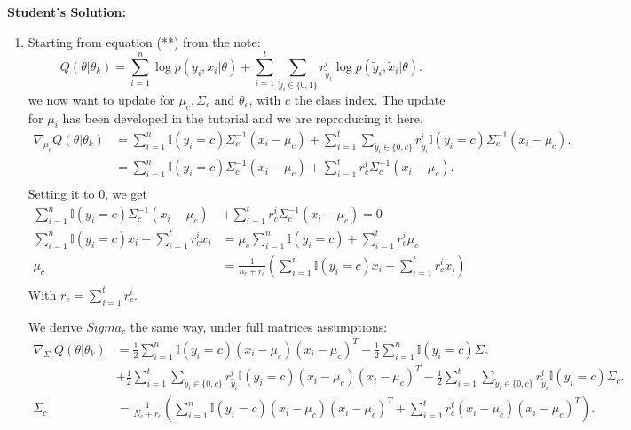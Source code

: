 \documentclass{article}
\begin{document}
\textbf{Student's Solution:}
\begin{enumerate}
  \item Starting from equation (**) from the note:
  \[
  Q(\theta|\theta_k) =  \sum_{i=1}^n \log p(y_i ,x_i |\theta)+ \sum_{i=1}^t\sum_{\tilde{y}_i\in\{0,1\}} r_{\tilde{y}_i}^i\log p(\tilde{y}_i ,\tilde{x}_i |\theta).
  \]
  we now want to update for $\mu_c,\Sigma_c$ and $\theta_c$, with $c$ the class index.
  The update for $\mu_i$ has been developed in the tutorial and we are reproducing it here.
  \begin{align}
  \nabla_{\mu_c} Q(\theta|\theta_k) &=  \sum_{i=1}^n \mathbb{I}(y_i = c)\Sigma_c^{-1}(x_i - \mu_c) + \sum_{i=1}^t\sum_{\tilde{y}_i\in\{0,c\}} r_{\tilde{y}_i}^i \mathbb{I}(y_i = c)\Sigma_c^{-1}(x_i - \mu_c).\\
  &=  \sum_{i=1}^n \mathbb{I}(y_i = c)\Sigma_c^{-1}(x_i - \mu_c) + \sum_{i=1}^t r_{c}^i\Sigma_c^{-1}(x_i - \mu_c).\\
  \end{align}
  Setting it to 0, we get
  \begin{align}
 \sum_{i=1}^n \mathbb{I}(y_i = c)\Sigma_c^{-1}(x_i - \mu_c) &+ \sum_{i=1}^t r_{c}^i\Sigma_c^{-1}(x_i - \mu_c) = 0\\
  \sum_{i=1}^n \mathbb{I}(y_i = c)x_i + \sum_{i=1}^t r_{c}^i x_i & =  \mu_c \sum_{i=1}^n \mathbb{I}(y_i = c)  +   \sum_{i=1}^t r_{c}^i\mu_c \\
  \mu_c &= \frac{1}{n_c + r_{c}} ( \sum_{i=1}^n \mathbb{I}(y_i = c)x_i + \sum_{i=1}^t r_{c}^i x_i ) \\
  \end{align}
  With $r_{c} = \sum_{i=1}^t r_{c}^i$.

  We derive $Sigma_c$ the same way, under full matrices assumptions:
  \begin{align}
  \nabla_{\Sigma_c} Q(\theta|\theta_k) &=  \frac{1}{2}\sum_{i=1}^n \mathbb{I}(y_i = c)(x_i - \mu_c)(x_i - \mu_c)^T -\frac{1}{2}\sum_{i=1}^n \mathbb{I}(y_i = c)\Sigma_c \\
  & + \frac{1}{2}\sum_{i=1}^t\sum_{\tilde{y}_i\in\{0,c\}} r_{\tilde{y}_i}^i \mathbb{I}(y_i = c)(x_i - \mu_c)(x_i - \mu_c)^T-\frac{1}{2}\sum_{i=1}^t\sum_{\tilde{y}_i\in\{0,c\}} r_{\tilde{y}_i}^i \mathbb{I}(y_i = c)\Sigma_c.\\
  \Sigma_c &=  \frac{1}{N_c+r_c}\left(\sum_{i=1}^n \mathbb{I}(y_i = c)(x_i - \mu_c)(x_i - \mu_c)^T + \sum_{i=1}^t r_{c}^i (x_i - \mu_c)(x_i - \mu_c)^T \right).\\
  \end{align}


\end{enumerate}
\end{document}

